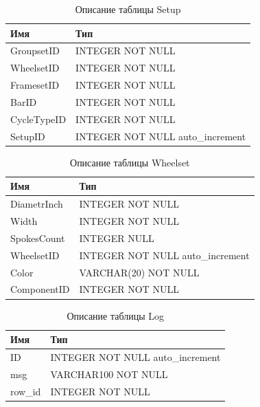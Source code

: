 \documentclass[a4paper,14pt]{extarticle}
\begin{document}

\begin{table}[h!] 
 \centering
	\caption{Описание таблицы Setup}
	\begin{tabular}{|l|l|}
  \hline \textbf{Имя} & \textbf{Тип} \\
		\hline
		GroupsetID &    INTEGER NOT NULL \\ \hline
		WheelsetID &    INTEGER NOT NULL \\ \hline
		FramesetID &    INTEGER NOT NULL \\ \hline
		BarID & INTEGER NOT NULL \\ \hline
		CycleTypeID &   INTEGER NOT NULL \\ \hline
		SetupID &       INTEGER NOT NULL auto\_increment \\ \hline
	\end{tabular}
	\label{tab:setup}
\end{table}



\begin{table}[h!] 
 \centering
	\caption{Описание таблицы Wheelset}
	\begin{tabular}{|l|l|}
  \hline \textbf{Имя} & \textbf{Тип} \\
		\hline
		DiametrInch &   INTEGER NOT NULL \\ \hline
		Width & INTEGER NOT NULL \\ \hline
		SpokesCount &   INTEGER NULL \\ \hline
		WheelsetID &    INTEGER NOT NULL auto\_increment \\ \hline
		Color & VARCHAR(20) NOT NULL \\ \hline
		ComponentID &   INTEGER NOT NULL \\ \hline
	\end{tabular}
	\label{tab:wheelset}
\end{table}

\begin{table}[h!] 
	\centering
	\caption{Описание таблицы Log}
	\begin{tabular}{|l|l|}
		\hline \textbf{Имя} & \textbf{Тип} \\
		\hline
		ID &   INTEGER NOT NULL auto\_increment \\ \hline
		msg & VARCHAR{100} NOT NULL \\ \hline
		row\_id & INTEGER NOT NULL \\ \hline
	\end{tabular}
	\label{tab:log}
\end{table}
\end{document}
